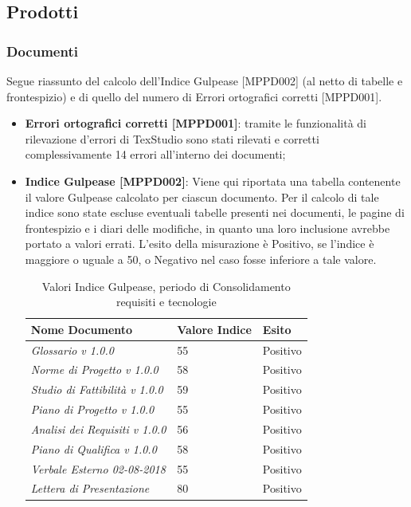 \documentclass[openany,12pt,a4paper]{report}
\begin{document}
\subsection{Prodotti}

\subsubsection{Documenti}

Segue riassunto del calcolo dell'Indice Gulpease [MPPD002] (al netto di tabelle e frontespizio) e di quello del numero di Errori ortografici corretti [MPPD001].

\begin{itemize}
	\item \textbf{Errori ortografici corretti [MPPD001]}: tramite le funzionalità di rilevazione d'errori di TexStudio sono stati rilevati e corretti complessivamente 14 errori all'interno dei documenti;
	
	\item \textbf{Indice Gulpease [MPPD002]}: Viene qui riportata una tabella contenente il valore Gulpease calcolato per ciascun documento.
	Per il calcolo di tale indice sono state escluse eventuali tabelle presenti nei documenti, le pagine di frontespizio e i diari delle modifiche, in quanto una loro inclusione avrebbe portato a valori errati. L'esito della misurazione è Positivo, se l'indice è maggiore o uguale a 50, o Negativo nel caso fosse inferiore a tale valore.
	
	\begin{table}[h]
		\begin{center}
			\setlength\LTleft{6mm}
			\begin{longtable}{|p{60mm}|p{30mm}|p{25mm}|}
				\hline  
				\textbf{Nome Documento} & \textbf{Valore Indice} & \textbf{Esito} \\ \hline    
				\textit{Glossario v 1.0.0} & 55 & Positivo\\ \hline    
				\textit{Norme di Progetto v 1.0.0} & 58 & Positivo\\ \hline    
				\textit{Studio di Fattibilità v 1.0.0} & 59 & Positivo\\ \hline    
				\textit{Piano di Progetto v 1.0.0} & 55 & Positivo\\ \hline    
				\textit{Analisi dei Requisiti v 1.0.0} & 56 & Positivo\\ \hline    
				\textit{Piano di Qualifica v 1.0.0} & 58 & Positivo\\ \hline    
				\textit{Verbale Esterno 02-08-2018} & 55 & Positivo\\ \hline    
				\textit{Lettera di Presentazione} & 80 & Positivo\\ \hline
			\end{longtable}
		\end{center}
		\caption{Valori Indice Gulpease, periodo di Consolidamento requisiti e tecnologie} 
	\end{table} 
	

\end{itemize}
\end{document}
